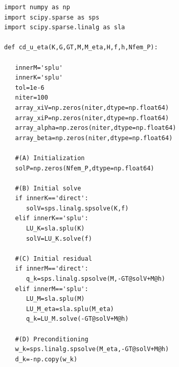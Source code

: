 \begin{lstlisting}
import numpy as np
import scipy.sparse as sps
import scipy.sparse.linalg as sla

def cd_u_eta(K,G,GT,M,M_eta,H,f,h,Nfem_P):

   innerM='splu'
   innerK='splu'
   tol=1e-6
   niter=100
   array_xiV=np.zeros(niter,dtype=np.float64) 
   array_xiP=np.zeros(niter,dtype=np.float64) 
   array_alpha=np.zeros(niter,dtype=np.float64) 
   array_beta=np.zeros(niter,dtype=np.float64) 

   #(A) Initialization
   solP=np.zeros(Nfem_P,dtype=np.float64)

   #(B) Initial solve
   if innerK=='direct':
      solV=sps.linalg.spsolve(K,f)  
   elif innerK=='splu':
      LU_K=sla.splu(K)
      solV=LU_K.solve(f)

   #(C) Initial residual
   if innerM=='direct': 
      q_k=sps.linalg.spsolve(M,-GT@solV+M@h)
   elif innerM=='splu':
      LU_M=sla.splu(M)
      LU_M_eta=sla.splu(M_eta)
      q_k=LU_M.solve(-GT@solV+M@h)

   #(D) Preconditioning
   w_k=sps.linalg.spsolve(M_eta,-GT@solV+M@h)    
   d_k=-np.copy(w_k)


\end{lstlisting}
